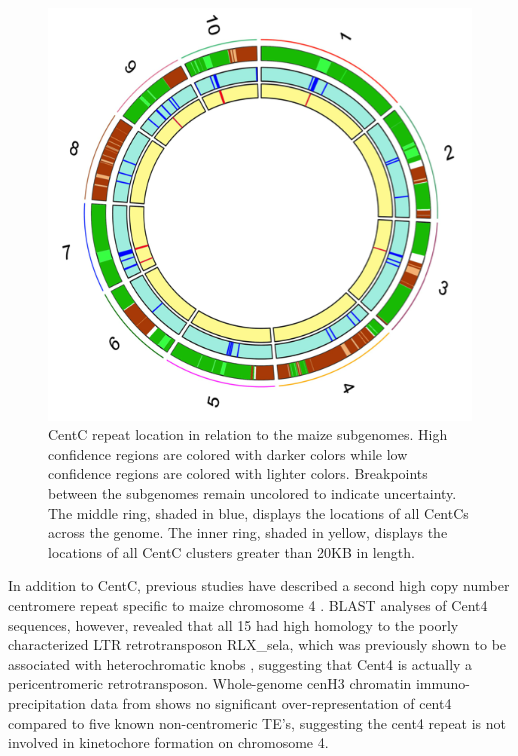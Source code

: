 \begin{figure}
  \includegraphics{circos.png}
\caption{CentC repeat location in relation to the maize subgenomes.  High confidence regions are colored with darker colors while low confidence regions are colored with lighter colors.  Breakpoints between the subgenomes remain uncolored to indicate uncertainty. The middle ring, shaded in blue, displays the locations of all CentCs across the genome.  The inner ring, shaded in yellow, displays the locations of all CentC clusters greater than 20KB in length.}
\label{circos}    
\end{figure}

In addition to CentC, previous studies have described a second high copy number centromere repeat specific to maize chromosome 4 \citep{Page2001}.   BLAST analyses of Cent4 sequences, however, revealed that all 15 had high homology to the poorly characterized LTR retrotransposon RLX\_sela, which was previously shown to be associated with heterochromatic  knobs \citep{Tenaillon2011, Chia2012}, suggesting that Cent4 is actually a pericentromeric retrotransposon.  Whole-genome cenH3 chromatin immuno-precipitation data from  \citet{Wolfgruber2009} shows no significant over-representation of cent4 compared to five known non-centromeric TE’s, suggesting the cent4 repeat is not involved in kinetochore formation on chromosome 4.
	

